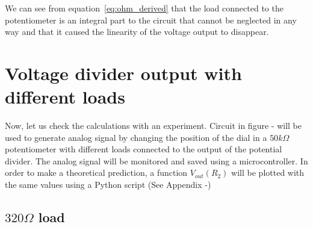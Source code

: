\documentclass{article}
\begin{document}
    We can see from equation~\eqref{eq:ohm_derived} that the load connected to 
    the potentiometer is an integral part to the circuit that cannot be neglected
    in any way and that it caused the linearity of the voltage output to disappear.

\section{Voltage divider output with different loads}

    Now, let us check the calculations with an experiment. Circuit in figure -
    will be used to generate analog signal by changing the position of the dial
    in a $50k\Omega$ potentiometer with different loads connected to the output
    of the potential divider. The analog signal will be monitored and saved using
    a microcontroller. In order to make a theoretical prediction, a function 
    $V_{out}(R_2)$ will be plotted with the same values using a Python script
    (See Appendix -)

    \subsection{$320\Omega$ load}

        \begin{figure}[H]%
            \centering
            \qquad
            \label{fig:load_320}%
        \end{figure}
\end{document}
